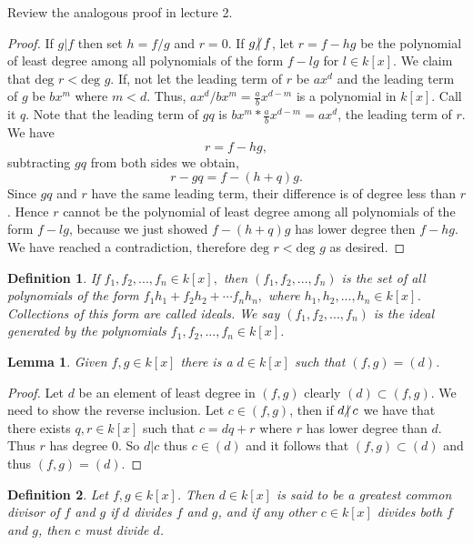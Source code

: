 \documentclass{article}
\theoremstyle{problemstyle}
\newtheorem{lemma}{Lemma}
\newtheorem{definition}{Definition}
\newcommand{\ndiv}{\hspace{-4pt}\not|\hspace{2pt}}
\begin{document}
Review the analogous proof in lecture 2.  

\begin{proof}
If $g|f$ then set $h = f/g$ and $r = 0$. If $g \ndiv f$, let $r = f-hg$ be the polynomial of least degree among all polynomials of the form $f-lg$ for $l \in k[x]$. We claim that $\text{deg }r < \text{deg }g$. If, not let the leading term of $r$ be $ax^d$ and the leading term of $g$ be $bx^m$ where $m < d$. Thus, $ax^d/bx^m = \frac{a}{b}x^{d-m}$ is a polynomial in $k[x]$.  Call it $q$. Note that the leading term of $gq$ is $bx^m * \frac{a}{b}x^{d-m} = ax^d$, the leading term of $r$. We have $$r = f-hg,$$ subtracting $gq$ from both sides we obtain, $$r-gq = f-(h+q)g.$$ Since $gq$ and $r$ have the same leading term, their difference is of degree less than $r$. Hence $r$ cannot be the polynomial of least degree among all polynomials of the form $f-lg$, because we just showed $f-(h+q)g$ has lower degree then $f-hg$. We have reached a contradiction, therefore $\text{deg }r < \text{deg }g$ as desired. 
\end{proof}

\begin{definition}
If $f_1,f_2,...,f_n \in k[x],$ then $(f_1,f_2,...,f_n)$ is the set of all polynomials of the form $f_1h_1+f_2h_2+\cdots f_nh_n,$ where $h_1,h_2,...,h_n \in k[x]$. Collections of this form are called ideals. We say $(f_1,f_2,...,f_n)$ is the ideal generated by the polynomials $f_1,f_2,...,f_n \in k[x]$. 
\end{definition}

\begin{lemma}
Given $f,g \in k[x]$ there is a $d \in k[x]$ such that $(f,g) = (d)$. 
\end{lemma}

\begin{proof}
Let $d$ be an element of least degree in $(f,g)$ clearly $(d) \subset (f,g)$. We need to show the reverse inclusion. Let $c \in (f,g)$, then if $d \ndiv c$ we have that there exists $q,r \in k[x]$ such that $c = dq + r$ where $r$ has lower degree than $d$. Thus $r$ has degree $0$. So $d|c$ thus $c \in (d)$ and it follows that $(f,g) \subset (d)$ and thus $(f,g) = (d)$. 
\end{proof}

\begin{definition}
Let $f,g \in k[x]$. Then $d \in k[x]$ is said to be a greatest common divisor of $f$ and $g$ if $d$ divides $f$ and $g$, and if any other $c \in k[x]$ divides both $f$ and $g$, then $c$ must divide $d$.  
\end{definition}
\end{document}
